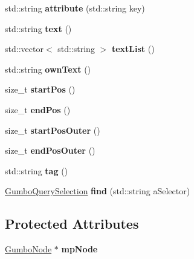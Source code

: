 \begin{DoxyCompactItemize}
std\+::string {\bfseries attribute} (std\+::string key)
\item 
\mbox{\label{class_gumbo_query_node_a57ad9db16a2f4455c53d837779047b4c}} 
std\+::string {\bfseries text} ()
\item 
\mbox{\label{class_gumbo_query_node_a24f381939f13ccf2b98d23c0732ca06a}} 
std\+::vector$<$ std\+::string $>$ {\bfseries text\+List} ()
\item 
\mbox{\label{class_gumbo_query_node_aa90c4baed6690cfb849f406fa9e96cb0}} 
std\+::string {\bfseries own\+Text} ()
\item 
\mbox{\label{class_gumbo_query_node_ae7314e8d4609c1a1f6af3ea74b192147}} 
size\+\_\+t {\bfseries start\+Pos} ()
\item 
\mbox{\label{class_gumbo_query_node_aaac832775881b2a9571a0ea146e5051f}} 
size\+\_\+t {\bfseries end\+Pos} ()
\item 
\mbox{\label{class_gumbo_query_node_a3602d412a637ba3df10d4ea0a521c73b}} 
size\+\_\+t {\bfseries start\+Pos\+Outer} ()
\item 
\mbox{\label{class_gumbo_query_node_ad2b61ac9d345b90fe3295080fbbaa4d1}} 
size\+\_\+t {\bfseries end\+Pos\+Outer} ()
\item 
\mbox{\label{class_gumbo_query_node_a5ccf046a9731eafb3c3501968e9f6b65}} 
std\+::string {\bfseries tag} ()
\item 
\mbox{\label{class_gumbo_query_node_a7d9b71afbf3d12329b575e269a7fd435}} 
\mbox{\hyperlink{class_gumbo_query_selection}{Gumbo\+Query\+Selection}} {\bfseries find} (std\+::string a\+Selector)
\end{DoxyCompactItemize}
\subsection*{Protected Attributes}
\begin{DoxyCompactItemize}
\item 
\mbox{\label{class_gumbo_query_node_abb48fdf0c226b03f17c970c71a7ba4fa}} 
\mbox{\hyperlink{gumbo_8h_a5f67d8397fda8fb7c90cc27f14ac4e7d}{Gumbo\+Node}} $\ast$ {\bfseries mp\+Node}
\end{DoxyCompactItemize}


